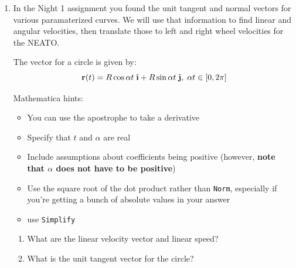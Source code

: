 \documentclass[M3_Night2_Solutions]{subfiles}
\begin{document}
\begin{enumerate}[series=exercises, label=\textbf{Exercise} (\arabic*)]
\item In the Night 1 assignment you found the unit tangent and normal vectors for various paramaterized curves. We will use that information to find linear and angular velocities, then translate those to left and right wheel velocities for the NEATO.

The vector for a circle is given by: \[ \r(t) = R \cos \alpha t \; \ihat + R \sin \alpha t \; \jhat, \; \alpha t \in [0,2 \pi] \]


Mathematica hints:
\begin{itemize}
\item You can use the apostrophe to take a derivative
\item Specify that $t$ and $\alpha$ are real
\item Include assumptions about coefficients being positive (however, {\bf note that $\alpha$ does not have to be positive})
\item Use the square root of the dot product rather than {\tt Norm}, especially if you're getting a bunch of absolute values in your answer
\item use {\tt Simplify}
\end{itemize}

\begin{enumerate} 
\item What are the linear velocity vector and linear speed?

\item What is the unit tangent vector for the circle?




\end{enumerate}
\end{enumerate}
\end{document}
